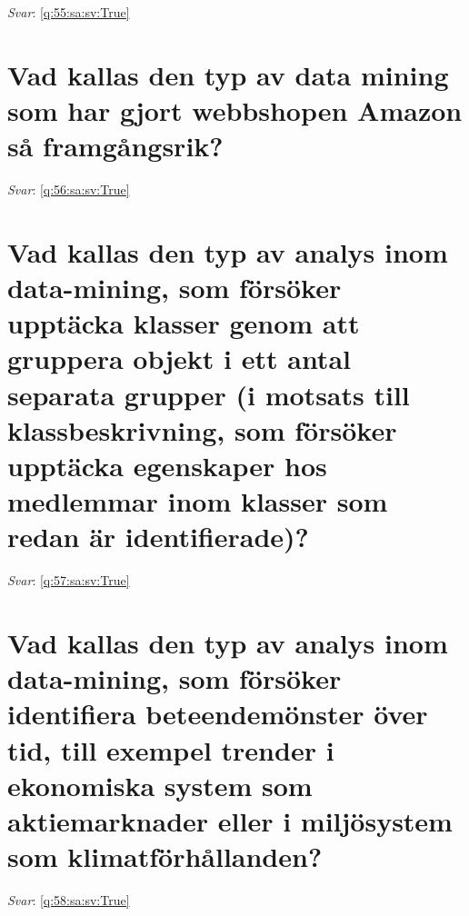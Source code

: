 \documentclass[a4paper,11pt,oneside]{book}
\begin{document}
\begin{sloppypar}
\textit{Svar}: \autoref{q:55:sa:sv:True}



\section{Vad kallas den typ av data mining som har gjort webbshopen Amazon s\r{a} framg\r{a}ngsrik?}

\label{q:56:sa:sv:False}

\vspace{2cm}

\noindent\makebox[\textwidth]{\hrulefill}

\vspace{1cm}

\textit{Svar}: \autoref{q:56:sa:sv:True}



\section{Vad kallas den typ av analys inom data-mining, som f\"ors\"oker uppt\"acka klasser genom att gruppera objekt i ett antal separata grupper (i motsats till klassbeskrivning, som f\"ors\"oker uppt\"acka egenskaper hos medlemmar inom klasser som redan \"ar identifierade)?}

\label{q:57:sa:sv:False}

\vspace{2cm}

\noindent\makebox[\textwidth]{\hrulefill}

\vspace{1cm}

\textit{Svar}: \autoref{q:57:sa:sv:True}



\section{Vad kallas den typ av analys inom data-mining, som f\"ors\"oker identifiera beteendem\"onster \"over tid, till exempel trender i ekonomiska system som aktiemarknader eller i milj\"osystem som klimatf\"orh\r{a}llanden?}

\label{q:58:sa:sv:False}

\vspace{2cm}

\noindent\makebox[\textwidth]{\hrulefill}

\vspace{1cm}

\textit{Svar}: \autoref{q:58:sa:sv:True}




\end{sloppypar}
\end{document}

